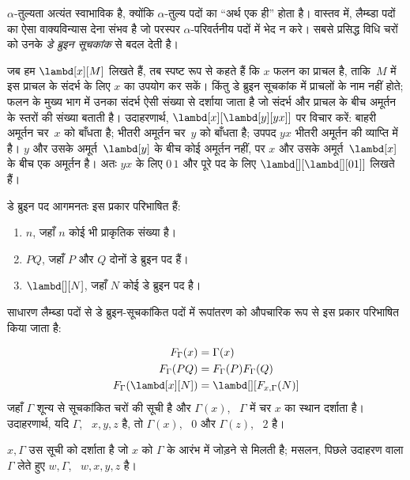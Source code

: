 \documentclass[../../../include/open-logic-section]{subfiles}
\begin{document}


$\alpha$-तुल्यता अत्यंत स्वाभाविक है, क्योंकि $\alpha$-तुल्य पदों का
``अर्थ एक ही'' होता है। वास्तव में, लैम्ब्डा पदों का ऐसा वाक्यविन्यास देना
संभव है जो परस्पर $\alpha$-परिवर्तनीय पदों में भेद न करे। सबसे प्रसिद्ध
विधि चरों को उनके \emph{डे ब्रुइन सूचकांक} से बदल देती है।

जब हम $\lambd[x][M]$ लिखते हैं, तब स्पष्ट रूप से कहते हैं कि $x$ फलन का
प्राचल है, ताकि~$M$ में इस प्राचल के संदर्भ के लिए $x$ का उपयोग कर सकें।
किंतु डे ब्रुइन सूचकांक में प्राचलों के नाम नहीं होते; फलन के मुख्य भाग में
उनका संदर्भ ऐसी संख्या से दर्शाया जाता है जो संदर्भ और प्राचल के बीच
अमूर्तन के स्तरों की संख्या बताती है। उदाहरणार्थ,
$\lambd[x][\lambd[y][y x]]$ पर विचार करें: बाहरी अमूर्तन चर~$x$ को बाँधता
है; भीतरी अमूर्तन चर~$y$ को बाँधता है; उपपद $y x$ भीतरी अमूर्तन की
व्याप्ति में है। $y$ और उसके अमूर्त~$\lambd[y]$ के बीच कोई अमूर्तन नहीं,
पर $x$ और उसके अमूर्त~$\lambd[x]$ के बीच एक अमूर्तन है। अतः $y x$ के लिए
$0\, 1$ और पूरे पद के लिए $\lambd[][\lambd[][01]]$ लिखते हैं।

\begin{defn}
  डे ब्रुइन पद आगमनतः इस प्रकार परिभाषित हैं:
  \begin{enumerate}
  \item $n$, जहाँ $n$ कोई भी प्राकृतिक संख्या है।
  \item $PQ$, जहाँ $P$ और $Q$ दोनों डे ब्रुइन पद हैं।
  \item $\lambd[][N]$, जहाँ $N$ कोई डे ब्रुइन पद है।
  \end{enumerate}
\end{defn}

साधारण लैम्ब्डा पदों से डे ब्रुइन-सूचकांकित पदों में रूपांतरण को औपचारिक
रूप से इस प्रकार परिभाषित किया जाता है:
\begin{defn}
  \begin{align*}
    F_\Gamma(x) &= \Gamma(x) \\
    F_\Gamma(PQ) &= F_\Gamma(P)F_\Gamma(Q) \\
    F_\Gamma(\lambd[x][N]) &= \lambd[][F_{x,\Gamma}(N)]
  \end{align*}
  जहाँ $\Gamma$ शून्य से सूचकांकित चरों की सूची है और $\Gamma(x)$,
  ~$\Gamma$ में चर $x$ का स्थान दर्शाता है। उदाहरणार्थ, यदि $\Gamma$,
  ~$x,y,z$ है, तो $\Gamma(x)$, ~$0$ और $\Gamma(z)$, ~$2$ है।
  
  $x,\Gamma$ उस सूची को दर्शाता है जो $x$ को $\Gamma$ के आरंभ में जोड़ने
  से मिलती है; मसलन, पिछले उदाहरण वाला $\Gamma$ लेते हुए $w,\Gamma$,
  ~$w,x,y,z$ है।
\end{defn}
\end{document}
